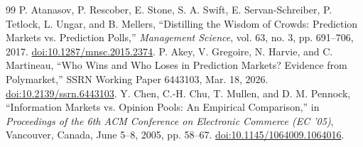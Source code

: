 \begingroup
\small
{}
\begin{thebibliography}{99}
\setlength{\itemsep}{7pt}
P. Atanasov, P. Rescober, E. Stone, S. A. Swift, E. Servan-Schreiber, P. Tetlock, L. Ungar, and B. Mellers, ``Distilling the Wisdom of Crowds: Prediction Markets vs. Prediction Polls,'' \textit{Management Science}, vol. 63, no. 3, pp. 691--706, 2017. \href{https://doi.org/10.1287/mnsc.2015.2374}{doi:10.1287/mnsc.2015.2374}.
P. Akey, V. Gregoire, N. Harvie, and C. Martineau, ``Who Wins and Who Loses in Prediction Markets? Evidence from Polymarket,'' SSRN Working Paper 6443103, Mar. 18, 2026. \href{http://dx.doi.org/10.2139/ssrn.6443103}{doi:10.2139/ssrn.6443103}.
Y. Chen, C.-H. Chu, T. Mullen, and D. M. Pennock, ``Information Markets vs. Opinion Pools: An Empirical Comparison,'' in \textit{Proceedings of the 6th ACM Conference on Electronic Commerce (EC '05)}, Vancouver, Canada, June 5--8, 2005, pp. 58--67. \href{https://doi.org/10.1145/1064009.1064016}{doi:10.1145/1064009.1064016}.


\end{thebibliography}

